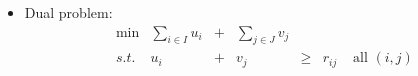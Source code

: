 \documentclass[mathserif]{beamer}
\begin{document}
{\begin{itemize}
	\item Dual problem: 
\[
\begin{array}{rrrrrrl}
 \min &  \sum_{i \in I}  u_{i} &+& \sum_{j \in J} v_{j} &          &                 & \\
s.t.      &                               u_{i} &+&                            v_{j} & \geq & r_{ij}     & \text{ all } (i, j)  \\
\end{array} \label{2} %
\]
	 
\end{itemize}

}



\end{document}
